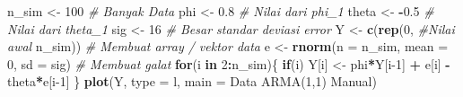 \documentclass[
]{book}
\newenvironment{Shaded}{\begin{snugshade}}{\end{snugshade}}
\newcommand{\AttributeTok}[1]{\textcolor[rgb]{0.13,0.29,0.53}{#1}}
\newcommand{\CommentTok}[1]{\textcolor[rgb]{0.56,0.35,0.01}{\textit{#1}}}
\newcommand{\ControlFlowTok}[1]{\textcolor[rgb]{0.13,0.29,0.53}{\textbf{#1}}}
\newcommand{\DecValTok}[1]{\textcolor[rgb]{0.00,0.00,0.81}{#1}}
\newcommand{\FloatTok}[1]{\textcolor[rgb]{0.00,0.00,0.81}{#1}}
\newcommand{\FunctionTok}[1]{\textcolor[rgb]{0.13,0.29,0.53}{\textbf{#1}}}
\newcommand{\NormalTok}[1]{#1}
\newcommand{\OtherTok}[1]{\textcolor[rgb]{0.56,0.35,0.01}{#1}}
\newcommand{\SpecialCharTok}[1]{\textcolor[rgb]{0.81,0.36,0.00}{\textbf{#1}}}
\newcommand{\StringTok}[1]{\textcolor[rgb]{0.31,0.60,0.02}{#1}}
\begin{document}
\begin{Shaded}
\begin{Highlighting}[]
\NormalTok{n\_sim }\OtherTok{\textless{}{-}} \DecValTok{100} \CommentTok{\# Banyak Data  }
\NormalTok{phi }\OtherTok{\textless{}{-}} \FloatTok{0.8} \CommentTok{\# Nilai dari phi\_1 }
\NormalTok{theta }\OtherTok{\textless{}{-}} \SpecialCharTok{{-}}\FloatTok{0.5} \CommentTok{\# Nilai dari theta\_1}
\NormalTok{sig }\OtherTok{\textless{}{-}} \DecValTok{16} \CommentTok{\# Besar standar deviasi error  }
\NormalTok{Y }\OtherTok{\textless{}{-}} \FunctionTok{c}\NormalTok{(}\FunctionTok{rep}\NormalTok{(}\DecValTok{0}\NormalTok{, }\CommentTok{\#Nilai awal}
\NormalTok{         n\_sim)) }\CommentTok{\# Membuat array / vektor data  }
\NormalTok{e }\OtherTok{\textless{}{-}} \FunctionTok{rnorm}\NormalTok{(}\AttributeTok{n =}\NormalTok{ n\_sim,}
         \AttributeTok{mean =} \DecValTok{0}\NormalTok{, }
         \AttributeTok{sd =}\NormalTok{ sig) }\CommentTok{\# Membuat galat}
\ControlFlowTok{for}\NormalTok{(i }\ControlFlowTok{in} \DecValTok{2}\SpecialCharTok{:}\NormalTok{n\_sim)\{}
\ControlFlowTok{if}\NormalTok{(i)}
\NormalTok{Y[i] }\OtherTok{\textless{}{-}}\NormalTok{ phi}\SpecialCharTok{*}\NormalTok{Y[i}\DecValTok{{-}1}\NormalTok{] }\SpecialCharTok{+}\NormalTok{ e[i] }\SpecialCharTok{{-}}\NormalTok{ theta}\SpecialCharTok{*}\NormalTok{e[i}\DecValTok{{-}1}\NormalTok{]}
\NormalTok{\}}
\FunctionTok{plot}\NormalTok{(Y, }\AttributeTok{type =} \StringTok{\textquotesingle{}l\textquotesingle{}}\NormalTok{,}
   \AttributeTok{main =} \StringTok{\textquotesingle{}Data ARMA(1,1) Manual\textquotesingle{}}\NormalTok{)}
\end{Highlighting}
\end{Shaded}
\end{document}
